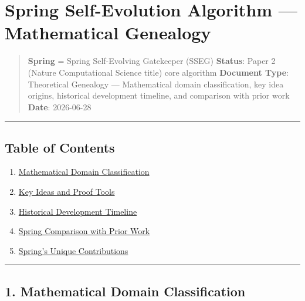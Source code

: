 \documentclass[
  12pt,
]{article}
\author{SCX}
\date{2026}
\providecommand{\tightlist}{%
  \setlength{\itemsep}{0pt}\setlength{\parskip}{0pt}}
\begin{document}
\section{Spring Self-Evolution Algorithm ---
Mathematical Genealogy}\label{spring-ux81eaux8fdbux5316ux7b97ux6cd5-ux6570ux5b66ux8c31ux7cfbux5b66}

\begin{quote}
\textbf{Spring} = Spring Self-Evolving Gatekeeper (SSEG)
\textbf{Status}: Paper 2 (Nature Computational Science title) core algorithm
\textbf{Document Type}: Theoretical Genealogy ---
Mathematical domain classification, key idea origins, historical development timeline, and comparison with prior work
\textbf{Date}: 2026-06-28
\end{quote}

\begin{center}\rule{0.5\linewidth}{0.5pt}\end{center}

\subsection{Table of Contents}\label{ux76eeux5f55}

\begin{enumerate}
\def\labelenumi{\arabic{enumi}.}
\tightlist
\item
  \hyperref[1-ux6570ux5b66ux9886ux57dfux5f52ux5c5e]{Mathematical Domain Classification}
\item
  \hyperref[2-ux5173ux952eux601dux60f3ux4e0eux8bc1ux660eux5de5ux5177]{Key Ideas and Proof Tools}
\item
  \hyperref[3-ux5386ux53f2ux53d1ux5c55ux65f6ux95f4ux7ebf]{Historical Development Timeline}
\item
  \hyperref[4-spring-ux4e0eux524dux4ebaux7684ux5bf9ux6bd4ux8868]{Spring
  Comparison with Prior Work}
\item
  \hyperref[5-spring-ux72ecux6709ux7684ux8d21ux732e]{Spring's Unique Contributions}
\end{enumerate}

\begin{center}\rule{0.5\linewidth}{0.5pt}\end{center}

\subsection{1. Mathematical Domain Classification}\label{ux6570ux5b66ux9886ux57dfux5f52ux5c5e}
\end{document}
